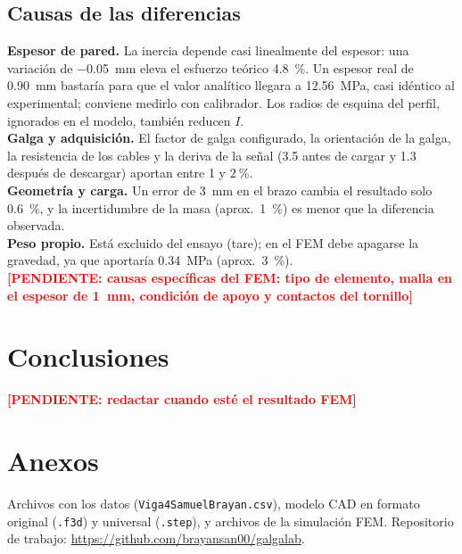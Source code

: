 \documentclass[11pt,a4paper]{article}
\newcommand{\pend}[1]{\textcolor{red}{\textbf{[PENDIENTE: #1]}}}
\begin{document}
\subsection{Causas de las diferencias}
\textbf{Espesor de pared.} La inercia depende casi linealmente del espesor: una variaci\'on de \SI{-0,05}{mm} eleva el esfuerzo te\'orico \SI{4,8}{\percent}. Un espesor real de \SI{0,90}{mm} bastar\'ia para que el valor anal\'itico llegara a \SI{12,56}{MPa}, casi id\'entico al experimental; conviene medirlo con calibrador. Los radios de esquina del perfil, ignorados en el modelo, tambi\'en reducen $I$.\\
\textbf{Galga y adquisici\'on.} El factor de galga configurado, la orientaci\'on de la galga, la resistencia de los cables y la deriva de la se\~nal (\SI{3,5}{\microstrain} antes de cargar y \SI{1,3}{\microstrain} despu\'es de descargar) aportan entre 1 y $\SI{2}{\percent}$.\\
\textbf{Geometr\'ia y carga.} Un error de \SI{3}{mm} en el brazo cambia el resultado solo \SI{0,6}{\percent}, y la incertidumbre de la masa (aprox.\ \SI{1}{\percent}) es menor que la diferencia observada.\\
\textbf{Peso propio.} Est\'a excluido del ensayo (tare); en el FEM debe apagarse la gravedad, ya que aportar\'ia \SI{0,34}{MPa} (aprox.\ \SI{3}{\percent}).\\
\pend{causas espec\'ificas del FEM: tipo de elemento, malla en el espesor de \SI{1}{mm}, condici\'on de apoyo y contactos del tornillo}

\section{Conclusiones}
\pend{redactar cuando est\'e el resultado FEM}

\appendix
\section{Anexos}
Archivos con los datos (\texttt{Viga4SamuelBrayan.csv}), modelo CAD en formato original (\texttt{.f3d}) y universal (\texttt{.step}), y archivos de la simulaci\'on FEM. Repositorio de trabajo: \url{https://github.com/brayansan00/galgalab}.
\end{document}
